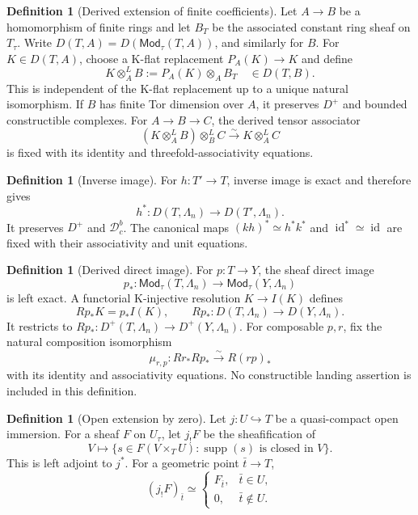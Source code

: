 \documentclass[10pt]{article}
\theoremstyle{definition}
\newtheorem{definition}[theorem]{Definition}
\newcommand{\Dbc}{\mathcal D^b_c}
\newcommand{\Mod}{\mathsf{Mod}}
\begin{document}
\begin{definition}[Derived extension of finite coefficients]
Let \(A\to B\) be a homomorphism of finite rings and let \(B_T\) be the
associated constant ring sheaf on \(T_\tau\).  Write
\(D(T,A)=D(\Mod_\tau(T,A))\), and similarly for \(B\).  For
\(K\in D(T,A)\), choose a K-flat replacement \(P_A(K)\to K\) and define
\[
 K\otimes_A^LB:=P_A(K)\otimes_AB_T
 \quad\in D(T,B).
\]
This is independent of the K-flat replacement up to a unique natural
isomorphism.  If \(B\) has finite Tor dimension over \(A\), it preserves
\(D^+\) and bounded constructible complexes.  For
\(A\to B\to C\), the derived tensor associator
\[
 (K\otimes_A^LB)\otimes_B^LC
 \xrightarrow{\sim}K\otimes_A^LC
\]
is fixed with its identity and threefold-associativity equations.
\end{definition}

\begin{definition}[Inverse image]
For \(h:T'\to T\), inverse image is exact and therefore gives
\[
 h^*:D(T,\Lambda_n)\longrightarrow D(T',\Lambda_n).
\]
It preserves \(D^+\) and \(\Dbc\).  The canonical maps
\((kh)^*\simeq h^*k^*\) and \(\operatorname{id}^*\simeq\operatorname{id}\)
are fixed with their associativity and unit equations.
\end{definition}

\begin{definition}[Derived direct image]
For \(p:T\to Y\), the sheaf direct image
\[
 p_*:\Mod_\tau(T,\Lambda_n)\to\Mod_\tau(Y,\Lambda_n)
\]
is left exact.  A functorial K-injective resolution \(K\to I(K)\) defines
\[
 Rp_*K=p_*I(K),\qquad
 Rp_*:D(T,\Lambda_n)\longrightarrow D(Y,\Lambda_n).
\]
It restricts to \(Rp_*:D^+(T,\Lambda_n)\to D^+(Y,\Lambda_n)\).
For composable \(p,r\), fix the natural composition isomorphism
\[
 \mu_{r,p}:Rr_*Rp_*\xrightarrow{\sim}R(rp)_*
\]
with its identity and associativity equations.  No constructible landing
assertion is included in this definition.
\end{definition}

\begin{definition}[Open extension by zero]
Let \(j:U\hookrightarrow T\) be a quasi-compact open immersion.  For a
sheaf \(F\) on \(U_\tau\), let \(j_!F\) be the sheafification of
\[
 V\longmapsto
 \{s\in F(V\times_TU):
   \operatorname{supp}(s)\text{ is closed in }V\}.
\]
This is left adjoint to \(j^*\).  For a geometric point \(\bar t\to T\),
\[
 (j_!F)_{\bar t}\simeq
 \begin{cases}
 F_{\bar t},&\bar t\in U,\\
 0,&\bar t\notin U.
 \end{cases}
\]
\end{definition}
\end{document}
